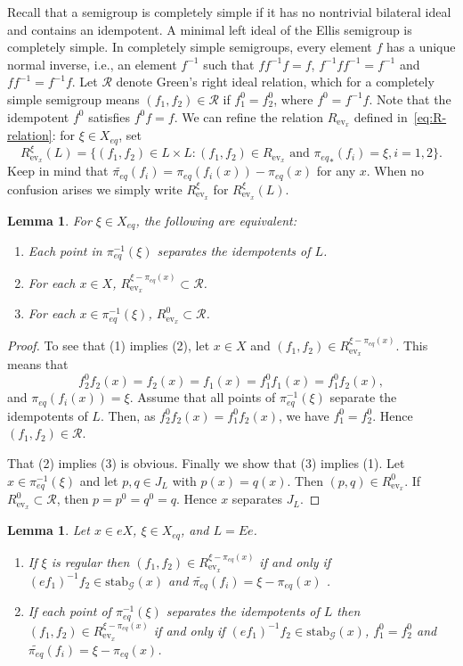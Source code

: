 \documentclass[10pt,a4paper]{amsart}
\newtheorem{lemma}[theorem]{Lemma}
\numberwithin{equation}{section}
\newcommand{\tcb}{\textcolor{blue}}
\newcommand{\Gg}{{\mathcal G}}
\newcommand{\Rr}{{\mathcal R}}
\newcommand{\Xe}{X_{eq}}
\newcommand{\pe}{\pi_{eq}}
\newcommand{\fb}[1]{\pe^{-1}(#1)}
\newcommand{\tpe}{\widetilde{\pe}}
\newcommand{\ev}{\mathrm{ev}}
\newcommand{\stab}{\mathrm{stab}}
\begin{document}
 Recall that a semigroup is  completely simple  if it has no nontrivial bilateral ideal and contains an idempotent. A minimal left ideal of the Ellis semigroup is completely simple. In completely simple semigroups, every element $f$ has a unique normal inverse, i.e., an element $f^{-1}$ such that $ff^{-1}f = f$, $f^{-1}ff^{-1} = f^{-1}$ and $ff^{-1}=f^{-1}f$. 
Let $\Rr$ denote Green's right ideal relation, which for a completely simple semigroup means $(f_1,f_2)\in \Rr$ if $f_1^0 = f_2^0$, where 
$f^0 = f^{-1} f$. Note that the idempotent  $f^0$   satisfies $f^0f=f$. We can refine the relation $R_{\ev_x}$ defined in~\eqref{eq:R-relation}: for $\xi\in\Xe$, set
$$R^\xi_{\ev_x}(L)=\{(f_1,f_2)\in L\times L: (f_1,f_2)\in R_{\ev_x} \mbox{ and } {\pe}_* (f_i)= \xi, i=1,2\}.$$ 
Keep in mind that $\tpe (f_i)= \pe(f_i(x)) -\pe(x)$  for any $x$. 
When no confusion  arises we simply write $R^\xi_{\ev_x}$ for $R^\xi_{\ev_x}(L)$.
\begin{lemma}\label{lem-Rr} For $\xi\in\Xe$, the following are equivalent:
\begin{enumerate}
\item Each point in $\fb{\xi}$ separates the idempotents of $L$.
\item For each $x\in X$, $R^{\xi-\pe(x)}_{\ev_x}\subset \Rr$. 
\item For each $x\in \fb{\xi}$, $R^0_{\ev_x}\subset \Rr$. 
\end{enumerate}
\end{lemma}
\begin{proof} To see that (1) implies (2),  
let $x\in X$ and $(f_1,f_2)\in R^{\xi-\pe(x)}_{\ev_x}$. This means that \[f_2^0 f_2(x)= f_2(x)=f_1(x)=f_1^0 f_1(x) = f_1^0 f_2(x) , \] and $\pe(f_i(x))=\xi$. Assume that all points of $\fb{\xi}$ separate the idempotents of $L$. Then, as $f_2^0 f_2(x)=  f_1^0 f_2(x)$, we have $f_1^0 = f_2^0$. Hence $(f_1,f_2)\in\Rr$.

That (2) implies (3) is  obvious. 
Finally we show that (3) implies (1). Let  $x\in\fb{\xi}$ and 
let $p,q\in J_L$ with $p(x)=q(x)$. Then $(p,q)\in R^0_{\ev_x}$. If $R^0_{\ev_x}\subset \Rr$, then $p=p^0=q^0=q$. Hence $x$ separates $J_L$.
\end{proof}
\begin{lemma} \label{lem-sing}
Let $x\in eX$, $\xi\in \Xe$, and $L=Ee$.
\begin{enumerate}
\item If  $\xi$ is regular then
$(f_1,f_2)\in R^{\xi-\pe(x)}_{\ev_{x}}$ if and only if $(ef_1)^{-1}f_2 \in \stab_{\Gg}(x)$ and $\tpe(f_i) = \xi-\pe(x)$     . 
\item  
If each point of $\fb{\xi}$ separates the idempotents of $L$ then
$(f_1,f_2)\in R^{\xi-\pe(x)}_{\ev_{x}}$ if and only if $(ef_1)^{-1}f_2 \in \stab_{\Gg}(x)$, $f_1^0=f_2^0$ and $\tpe(f_i) = \xi-\pe(x)$. 
\end{enumerate}
\end{lemma}
\end{document}
